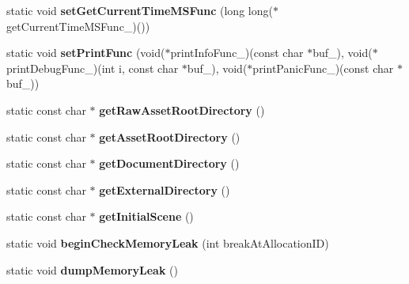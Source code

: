 \begin{DoxyCompactItemize}
\item 
static void {\bfseries set\+Get\+Current\+Time\+M\+S\+Func} (long long($\ast$get\+Current\+Time\+M\+S\+Func\+\_\+)())\hypertarget{class_magnum_1_1_stage_ac74f119a4d75d9388d777573f0e6219b}{}\label{class_magnum_1_1_stage_ac74f119a4d75d9388d777573f0e6219b}

\item 
static void {\bfseries set\+Print\+Func} (void($\ast$print\+Info\+Func\+\_\+)(const char $\ast$buf\+\_\+), void($\ast$print\+Debug\+Func\+\_\+)(int i, const char $\ast$buf\+\_\+), void($\ast$print\+Panic\+Func\+\_\+)(const char $\ast$buf\+\_\+))\hypertarget{class_magnum_1_1_stage_a2b16b1bdf2bafa3063b4188b7332fb39}{}\label{class_magnum_1_1_stage_a2b16b1bdf2bafa3063b4188b7332fb39}

\item 
static const char $\ast$ {\bfseries get\+Raw\+Asset\+Root\+Directory} ()\hypertarget{class_magnum_1_1_stage_a5b47872ce5d86de357050d36133fb109}{}\label{class_magnum_1_1_stage_a5b47872ce5d86de357050d36133fb109}

\item 
static const char $\ast$ {\bfseries get\+Asset\+Root\+Directory} ()\hypertarget{class_magnum_1_1_stage_a23d617fe85a7dd6c0ac8c8369dab58de}{}\label{class_magnum_1_1_stage_a23d617fe85a7dd6c0ac8c8369dab58de}

\item 
static const char $\ast$ {\bfseries get\+Document\+Directory} ()\hypertarget{class_magnum_1_1_stage_a70853a6819cd0d57ab0ec41e1f4afddc}{}\label{class_magnum_1_1_stage_a70853a6819cd0d57ab0ec41e1f4afddc}

\item 
static const char $\ast$ {\bfseries get\+External\+Directory} ()\hypertarget{class_magnum_1_1_stage_a7ae88951ba255c81cc6eace36c566d80}{}\label{class_magnum_1_1_stage_a7ae88951ba255c81cc6eace36c566d80}

\item 
static const char $\ast$ {\bfseries get\+Initial\+Scene} ()\hypertarget{class_magnum_1_1_stage_a474a9565e53e873ba91a8933b1742077}{}\label{class_magnum_1_1_stage_a474a9565e53e873ba91a8933b1742077}

\item 
static void {\bfseries begin\+Check\+Memory\+Leak} (int break\+At\+Allocation\+ID)\hypertarget{class_magnum_1_1_stage_aa43f582a7e4399d0666a9c4b90f8b97d}{}\label{class_magnum_1_1_stage_aa43f582a7e4399d0666a9c4b90f8b97d}

\item 
static void {\bfseries dump\+Memory\+Leak} ()\hypertarget{class_magnum_1_1_stage_a6b3b3d3343c6e5c603a981239559f454}{}\label{class_magnum_1_1_stage_a6b3b3d3343c6e5c603a981239559f454}


\end{DoxyCompactItemize}
